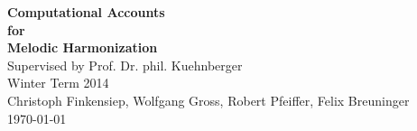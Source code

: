 \begin{titlepage}
		\centering
		\textbf{\Huge Computational Accounts\\\vspace{2 mm} for\\\vspace{5 mm} Melodic Harmonization}\\
		\vspace{15 mm}Supervised by Prof. Dr. phil. Kuehnberger\\ 
		\vspace{5 mm}Winter Term 2014\\
		\vspace{\fill}
		\raggedleft Christoph Finkensiep, Wolfgang Gross, Robert Pfeiffer, Felix Breuninger\\
		\vspace{5 mm}\today
\end{titlepage}